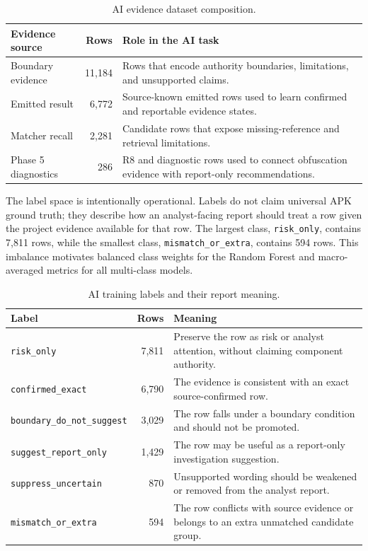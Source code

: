 \begin{table}[H]
\centering
\caption{AI evidence dataset composition.}
\label{tab:pfe-ai-dataset-composition}
\begin{tabularx}{\textwidth}{L{0.28\textwidth}rX}
\toprule
\textbf{Evidence source} & \textbf{Rows} & \textbf{Role in the AI task}\\
\midrule
Boundary evidence & 11,184 & Rows that encode authority boundaries,
limitations, and unsupported claims.\\
Emitted result & 6,772 & Source-known emitted rows used to learn
confirmed and reportable evidence states.\\
Matcher recall & 2,281 & Candidate rows that expose missing-reference and
retrieval limitations.\\
Phase 5 diagnostics & 286 & R8 and diagnostic rows used to connect
obfuscation evidence with report-only recommendations.\\
\bottomrule
\end{tabularx}
\end{table}

The label space is intentionally operational. Labels do not claim universal
APK ground truth; they describe how an analyst-facing report should treat a
row given the project evidence available for that row. The largest class,
\texttt{risk\_only}, contains 7,811 rows, while the smallest class,
\texttt{mismatch\_or\_extra}, contains 594 rows. This imbalance motivates
balanced class weights for the Random Forest and macro-averaged metrics for
all multi-class models.

\begin{table}[H]
\centering
\caption{AI training labels and their report meaning.}
\label{tab:pfe-ai-label-distribution}
\begin{tabularx}{\textwidth}{L{0.28\textwidth}rX}
\toprule
\textbf{Label} & \textbf{Rows} & \textbf{Meaning}\\
\midrule
\texttt{risk\_only} & 7,811 & Preserve the row as risk or analyst attention,
without claiming component authority.\\
\texttt{confirmed\_exact} & 6,790 & The evidence is consistent with an exact
source-confirmed row.\\
\texttt{boundary\_do\_not\_suggest} & 3,029 & The row falls under a boundary
condition and should not be promoted.\\
\texttt{suggest\_report\_only} & 1,429 & The row may be useful as a
report-only investigation suggestion.\\
\texttt{suppress\_uncertain} & 870 & Unsupported wording should be weakened or
removed from the analyst report.\\
\texttt{mismatch\_or\_extra} & 594 & The row conflicts with source evidence or
belongs to an extra unmatched candidate group.\\
\bottomrule
\end{tabularx}
\end{table}

